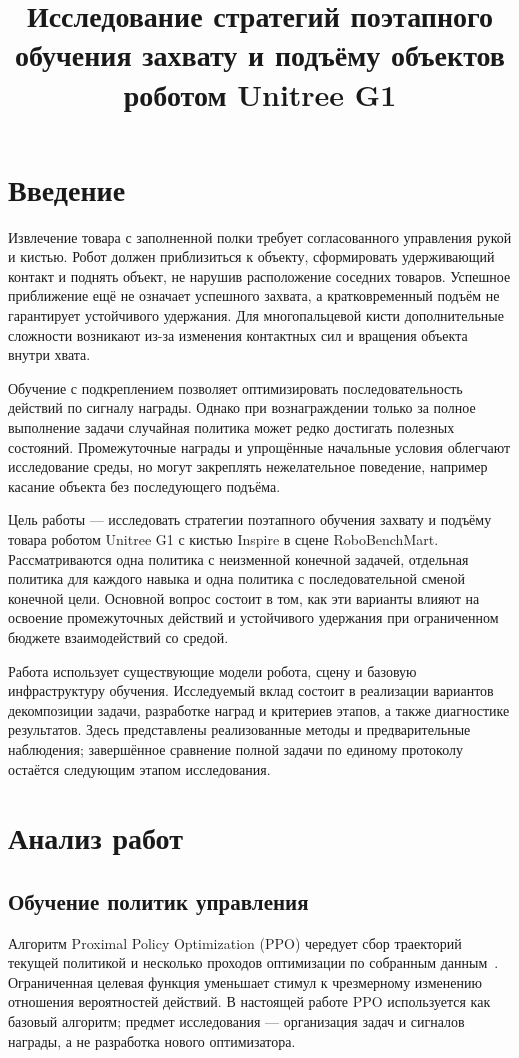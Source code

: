 \documentclass{misisarticle}
\title{Исследование стратегий поэтапного обучения захвату и подъёму объектов роботом Unitree G1}
\begin{document}
\maketitle

\section{Введение}
Извлечение товара с заполненной полки требует согласованного управления рукой и кистью. Робот должен приблизиться к объекту, сформировать удерживающий контакт и поднять объект, не нарушив расположение соседних товаров. Успешное приближение ещё не означает успешного захвата, а кратковременный подъём не гарантирует устойчивого удержания. Для многопальцевой кисти дополнительные сложности возникают из-за изменения контактных сил и вращения объекта внутри хвата.

Обучение с подкреплением позволяет оптимизировать последовательность действий по сигналу награды. Однако при вознаграждении только за полное выполнение задачи случайная политика может редко достигать полезных состояний. Промежуточные награды и упрощённые начальные условия облегчают исследование среды, но могут закреплять нежелательное поведение, например касание объекта без последующего подъёма.

Цель работы --- исследовать стратегии поэтапного обучения захвату и подъёму товара роботом Unitree G1 с кистью Inspire в сцене RoboBenchMart. Рассматриваются одна политика с неизменной конечной задачей, отдельная политика для каждого навыка и одна политика с последовательной сменой конечной цели. Основной вопрос состоит в том, как эти варианты влияют на освоение промежуточных действий и устойчивого удержания при ограниченном бюджете взаимодействий со средой.

Работа использует существующие модели робота, сцену и базовую инфраструктуру обучения. Исследуемый вклад состоит в реализации вариантов декомпозиции задачи, разработке наград и критериев этапов, а также диагностике результатов. Здесь представлены реализованные методы и предварительные наблюдения; завершённое сравнение полной задачи по единому протоколу остаётся следующим этапом исследования.

\section{Анализ работ}
\subsection{Обучение политик управления}
Алгоритм Proximal Policy Optimization (PPO) чередует сбор траекторий текущей политикой и несколько проходов оптимизации по собранным данным~\cite{ppo}. Ограниченная целевая функция уменьшает стимул к чрезмерному изменению отношения вероятностей действий. В настоящей работе PPO используется как базовый алгоритм; предмет исследования --- организация задач и сигналов награды, а не разработка нового оптимизатора.
\end{document}
